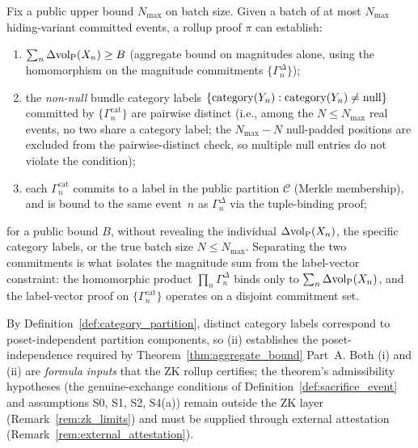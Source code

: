 \begin{proposition}
Fix a public upper bound $N_{\max}$ on batch size.  Given a batch
of at most $N_{\max}$ hiding-variant committed events, a rollup
proof $\pi$ can establish:
\begin{enumerate}
\item[(i)] $\sum_{n} \Delta{\operatorname{vol}_{\mathrm{P}}}(X_n) \geq B$
  (aggregate bound on magnitudes alone, using the homomorphism
  on the magnitude commitments $\{\Gamma^{\Delta}_n\}$);
\item[(ii)] the \emph{non-null} bundle category labels
  $\{\mathrm{category}(Y_{n}) : \mathrm{category}(Y_{n}) \neq \mathrm{null}\}$ committed by
  $\{\Gamma^{\mathrm{cat}}_n\}$ are pairwise distinct (i.e.,
  among the $N \leq N_{\max}$ real events, no two share a
  category label; the $N_{\max} - N$ null-padded positions are
  excluded from the pairwise-distinct check, so multiple null
  entries do not violate the condition);
\item[(iii)] each $\Gamma^{\mathrm{cat}}_n$ commits to a label
  in the public partition $\mathcal{C}$ (Merkle membership),
  and is bound to the same event~$n$ as $\Gamma^{\Delta}_n$
  via the tuple-binding proof;
\end{enumerate}
for a public bound $B$, without revealing the individual
$\Delta{\operatorname{vol}_{\mathrm{P}}}(X_n)$, the specific category labels, or the true
batch size $N \leq N_{\max}$.  Separating the two commitments
is what isolates the magnitude sum from the label-vector
constraint: the homomorphic product
$\prod_n \Gamma^{\Delta}_n$ binds only to
$\sum_n \Delta{\operatorname{vol}_{\mathrm{P}}}(X_n)$, and the label-vector proof on
$\{\Gamma^{\mathrm{cat}}_n\}$ operates on a disjoint commitment
set.

By Definition~\ref{def:category_partition}, distinct category
labels correspond to poset-independent partition components, so
(ii) establishes the poset-independence required by
Theorem~\ref{thm:aggregate_bound} Part~A.  Both (i) and (ii) are
\emph{formula inputs} that the ZK rollup certifies; the
theorem's admissibility hypotheses (the genuine-exchange
conditions of Definition~\ref{def:sacrifice_event} and
assumptions S0, S1, S2, S4(a)) remain outside the ZK layer
(Remark~\ref{rem:zk_limits}) and must be supplied through
external attestation (Remark~\ref{rem:external_attestation}).
\end{proposition}

